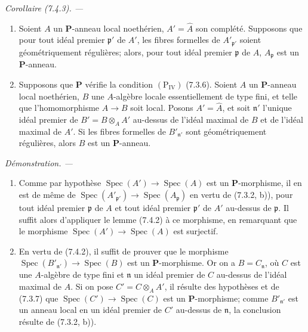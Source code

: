 \documentclass[10pt,oneside]{book}
\newenvironment{corollary}[1][]{%
  \par\medskip\noindent\itshape Corollaire (#1). ---\ }{\par}
\newenvironment{proof}{%
  \par\medskip\noindent\textit{Démonstration. ---\ }}{\par}
\begin{document}
\begin{corollary}[7.4.3]
\label{IV.2.s7.4.3-fr}
\begin{enumerate}
\item[\emph{(i)}] Soient $A$ un $\boldsymbol P$-anneau local noethérien,
$A'=\widehat A$ son complété. Supposons que pour tout idéal premier
$\mathfrak p'$ de $A'$, les fibres formelles de $A'_{\mathfrak p'}$ soient
géométriquement régulières; alors, pour tout idéal premier $\mathfrak p$ de
$A$, $A_{\mathfrak p}$ est un $\boldsymbol P$-anneau.
\item[\emph{(ii)}] Supposons que $\boldsymbol P$ vérifie la condition
$(\mathrm P_{\mathrm{IV}})$ (7.3.6). Soient $A$ un $\boldsymbol P$-anneau
local noethérien, $B$ une $A$-algèbre locale essentiellement de type fini,
et telle que l'homomorphisme $A\to B$ soit local. Posons $A'=\widehat A$,
et soit $\mathfrak n'$ l'unique idéal premier de
$B'=B\otimes_A A'$ au-dessus de l'idéal maximal de $B$ et de l'idéal
maximal de $A'$. Si les fibres formelles de $B'_{\mathfrak n'}$ sont
géométriquement régulières, alors $B$ est un $\boldsymbol P$-anneau.
\end{enumerate}
\end{corollary}

\begin{proof}
\begin{enumerate}
\item[\emph{(i)}] Comme par hypothèse
$\operatorname{Spec}(A')\to\operatorname{Spec}(A)$ est un
$\boldsymbol P$-morphisme, il en est de même de
$\operatorname{Spec}(A'_{\mathfrak p'})\to
\operatorname{Spec}(A_{\mathfrak p})$ en vertu de (7.3.2, b)), pour tout
idéal premier $\mathfrak p$ de $A$ et tout idéal premier $\mathfrak p'$ de
$A'$ au-dessus de $\mathfrak p$. Il suffit alors d'appliquer le lemme
(7.4.2) à ce morphisme, en remarquant que le morphisme
$\operatorname{Spec}(A')\to\operatorname{Spec}(A)$ est surjectif.
\item[\emph{(ii)}] En vertu de (7.4.2), il suffit de prouver que le morphisme
$\operatorname{Spec}(B'_{\mathfrak n'})\to\operatorname{Spec}(B)$ est un
$\boldsymbol P$-morphisme. Or on a $B=C_{\mathfrak n}$, où $C$ est une
$A$-algèbre de type fini et $\mathfrak n$ un idéal premier de $C$ au-dessus
de l'idéal maximal de $A$. Si on pose $C'=C\otimes_A A'$, il résulte des
hypothèses et de (7.3.7) que
$\operatorname{Spec}(C')\to\operatorname{Spec}(C)$ est un
$\boldsymbol P$-morphisme; comme $B'_{\mathfrak n'}$ est un anneau local en
un idéal premier de $C'$ au-dessus de $\mathfrak n$, la conclusion résulte
de (7.3.2, b)).
\end{enumerate}
\end{proof}
\end{document}
